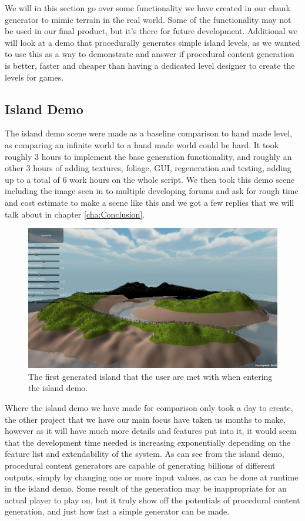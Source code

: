We will in this section go over some functionality we have created in our chunk generator to mimic terrain in the real world. Some of the functionality may not be used in our final product, but it's there for future development. Additional we will look at a demo that procedurally generates simple island levels, as we wanted to use this as a way to demonstrate and answer if procedural content generation is better, faster and cheaper than having a dedicated level designer to create the levels for games.


\subsection{Island Demo}
\label{IslandDemo}
The island demo scene were made as a baseline comparison to hand made level, as comparing an infinite world to a hand made world could be hard. It took roughly 3 hours to implement the base generation functionality, and roughly an other 3 hours of adding textures, foliage, GUI, regeneration and testing, adding up to a total of 6 work hours on the whole script. We then took this demo scene including the image seen in  to multiple developing forums and ask for rough time and cost estimate to make a scene like this and we got a few replies that we will talk about in chapter \ref{cha:Conclusion}.

\begin{figure}[H]
	\includegraphics[width=1\linewidth]{img/IslandDemo}
	\centering
	\caption{The first generated island that the user are met with when entering the island demo.}
	\label{fig:IslandDemo}
\end{figure}

Where the island demo we have made for comparison only took a day to create, the other project that we have our main focus have taken us months to make, however as it will have much more details and features put into it, it would seem that the development time needed is increasing exponentially depending on the feature list and extendability of the system. As can see from the island demo, procedural content generators are capable of generating billions of different outputs, simply by changing one or more input values, as can be done at runtime in the island demo. Some result of the generation may be inappropriate for an actual player to play on, but it truly show off the potentials of procedural content generation, and just how fast a simple generator can be made.


